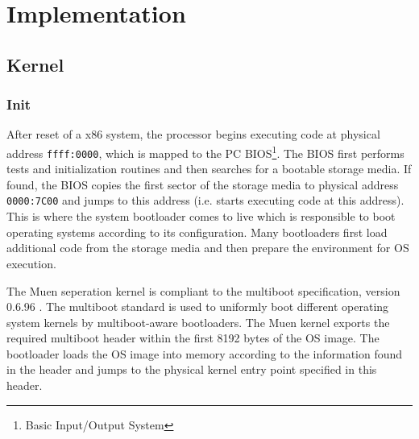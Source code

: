 \chapter{Implementation}





\section{Kernel}
\subsection{Init}\label{subsec:init}
After reset of a x86 system, the processor begins executing code at physical
address \texttt{ffff:0000}, which is mapped to the PC
BIOS\footnote{Basic Input/Output System}. The BIOS first performs
tests and initialization routines and then searches for a bootable storage
media. If found, the BIOS copies the first sector of the storage media to
physical address \texttt{0000:7C00} and jumps to this address (i.e. starts
executing code at this address). This is where the system bootloader comes to
live which is responsible to boot operating systems according to its
configuration. Many bootloaders first load additional code from the storage
media and then prepare the environment for OS execution.

The Muen seperation kernel is compliant to the multiboot specification, version
0.6.96 \cite{multiboot}. The multiboot standard is used to uniformly boot
different operating system kernels by multiboot-aware bootloaders.
The Muen kernel exports the required multiboot header within the first 8192
bytes of the OS image. The bootloader loads the OS image into memory according
to the information found in the header and jumps to the physical kernel entry
point specified in this header.

